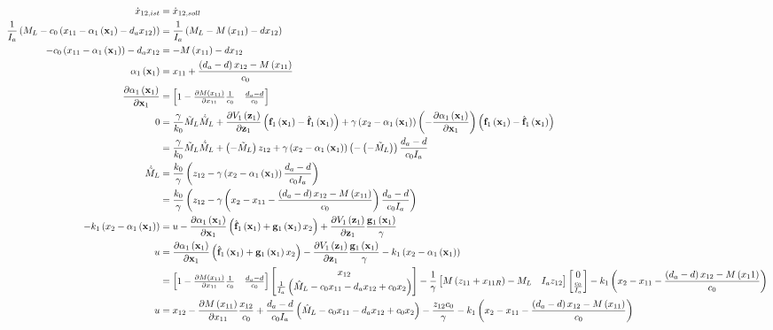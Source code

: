 \documentclass[10pt,a3paper,landscape]{article}
\begin{document}
\begin{align}
	\dot{x}_{12,ist}&=\dot{x}_{12,soll}\\
	\frac{1}{I_a}\mybr{M_L-c_0\mybr{x_{11}-\alphae-d_a x_{12}}}&=\frac{1}{I_a}\mybr{M_L-M\mybr{x_{11}}-d x_{12}}\\
	-c_0\mybr{x_{11}-\alphae}-d_a x_{12}&=-M\mybr{x_{11}}-d x_{12}\\
	\alphae&=x_{11}+\frac{\mybr{d_a-d}x_{12}-M\mybr{x_{11}}}{c_0}\\
	\dadxe&=\begin{bmatrix}1-\frac{\partial M\mybr{x_{11}}}{\partial x_{11}} \frac{1}{c_0} & \frac{d_a-d}{c_0}\end{bmatrix}\\
	0&=\frac{\gamma}{k_0}\mls\mlsp+\dVedze\mybr{\fe-\fed}+\gamma\mybr{x_2-\alphae}\mybr{-\dadxe}\mybr{\fe-\fed}\\
	&=\frac{\gamma}{k_0}\mls\mlsp+\mybr{-\mls}z_{12}+\gamma\mybr{x_2-\alphae}\mybr{-\mybr{-\mls}}\frac{d_a-d}{c_0I_a}\\
	\mlsp&=\frac{k_0}{\gamma}\mybr{z_{12}-\gamma\mybr{x_2-\alphae}\frac{d_a-d}{c_0 I_a}}\\
	&=\frac{k_0}{\gamma}\mybr{z_{12}-\gamma\mybr{x_2-x_{11}-\frac{\mybr{d_a-d}x_{12}-M\mybr{x_{11}}}{c_0}}\frac{d_a-d}{c_0 I_a}}\\
	-k_1\mybr{x_2-\alphae}&=u-\dadxe\mybr{\fed+\ge x_2}+\dVedze \frac{\ge}{\gamma}\\
	u&=\dadxe\mybr{\fed+\ge x_2}-\dVedze \frac{\ge}{\gamma}-k_1\mybr{x_2-\alphae}\\
	&=\begin{bmatrix}1-\frac{\partial M\mybr{x_{11}}}{\partial x_{11}} \frac{1}{c_0} & \frac{d_a-d}{c_0}\end{bmatrix}\begin{bmatrix}x_{12}\\
	\frac{1}{I_a}\mybr{\mld-c_0x_{11}-d_a x_{12}+c_0x_2}
	\end{bmatrix}-\frac{1}{\gamma}\begin{bmatrix}M\mybr{z_{11}+x_{11R}}-M_L & I_a z_{12}\end{bmatrix}\begin{bmatrix}
	0\\\frac{c_0}{I_a}
	\end{bmatrix}-k_1\mybr{x_2-x_{11}-\frac{\mybr{d_a-d}x_{12}-M\mybr{x_11}}{c_0}}\\
	u&=x_{12}-\frac{\partial M\mybr{x_{11}}}{\partial x_{11}}\frac{x_{12}}{c_0}+\frac{d_a-d}{c_0 I_a}\mybr{\mld-c_0 x_{11}-d_a x_{12}+c_0 x_2}-\frac{z_{12} c_0}{\gamma}-k_1\mybr{x_2-x_{11}-\frac{\mybr{d_a-d}x_{12}-M\mybr{x_{11}}}{c_0}}
\end{align}
\end{document}
